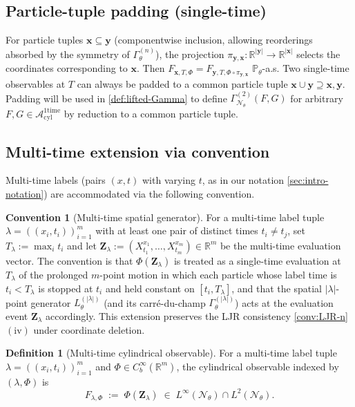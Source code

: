 \documentclass[11pt,reqno]{amsart}
\theoremstyle{plain}
\theoremstyle{definition}
\newtheorem{definition}[theorem]{Definition}
\newtheorem{convention}[theorem]{Convention}
\theoremstyle{remark}
\newcommand{\R}{\mathbb R}
\newcommand{\Prob}{\mathbb P}
\newcommand{\cA}{\mathcal A}
\newcommand{\cN}{\mathcal N}
\newcommand{\Aone}{\cA_{\mathrm{cyl}}^{\mathrm{1time}}}
\newcommand{\GamN}{\Gamma^{(2)}_{\cN_{\theta}}}
\newcommand{\GamM}[1]{\Gamma^{(#1)}_{\theta}}
\newcommand{\Lth}[1]{L^{(#1)}_{\theta}}
\newcommand{\Pth}{\Prob_{\theta}}
\begin{document}
\subsection{Particle-tuple padding (single-time)}\label{sec:cyl-padding-1t}

For particle tuples $\mathbf x\subseteq\mathbf y$ (componentwise
inclusion, allowing reorderings absorbed by the symmetry of
$\GamM{n}$), the projection
$\pi_{\mathbf y,\mathbf x}\colon\R^{|\mathbf y|}\to\R^{|\mathbf x|}$
selects the coordinates corresponding to $\mathbf x$. Then
$F_{\mathbf x,T,\Phi}=F_{\mathbf y,T,\Phi\circ\pi_{\mathbf y,\mathbf x}}$
$\Pth$-a.s. Two single-time observables at $T$ can always be padded
to a common particle tuple
$\mathbf x\cup\mathbf y\supseteq\mathbf x,\mathbf y$. Padding will
be used in \cref{def:lifted-Gamma} to define $\GamN(F,G)$ for
arbitrary $F,G\in\Aone$ by reduction to a common particle tuple.

\subsection{Multi-time extension via convention}\label{sec:cyl-multi-time}

Multi-time labels (pairs $(x,t)$ with varying $t$, as in our
notation \cref{sec:intro-notation}) are accommodated via the
following convention.

\begin{convention}[Multi-time spatial generator]\label{conv:multi-time}
For a multi-time label tuple
$\lambda=((x_{i},t_{i}))_{i=1}^{m}$ with at least one pair of
distinct times $t_{i}\neq t_{j}$, set
$T_{\lambda}:=\max_{i}t_{i}$ and let
$\mathbf Z_{\lambda}:=(X^{x_{1}}_{t_{1}},\ldots,X^{x_{m}}_{t_{m}})\in\R^{m}$
be the multi-time evaluation vector. The convention is that
$\Phi(\mathbf Z_{\lambda})$ is treated as a single-time evaluation
at $T_{\lambda}$ of the prolonged $m$-point motion in which each
particle whose label time is $t_{i}<T_{\lambda}$ is stopped at
$t_{i}$ and held constant on $[t_{i},T_{\lambda}]$, and that the
spatial $|\lambda|$-point generator $\Lth{|\lambda|}$ (and its
carr\'e-du-champ $\GamM{|\lambda|}$) acts at the evaluation event
$\mathbf Z_{\lambda}$ accordingly. This extension preserves the LJR
consistency \cref{conv:LJR-n}$(\mathrm{iv})$ under coordinate
deletion.
\end{convention}

\begin{definition}[Multi-time cylindrical observable]\label{def:cyl-observable}
For a multi-time label tuple
$\lambda=((x_{i},t_{i}))_{i=1}^{m}$ and
$\Phi\in C_{b}^{\infty}(\R^{m})$, the cylindrical observable
indexed by $(\lambda,\Phi)$ is
\begin{equation}\label{eq:F-lambda-Phi}
  F_{\lambda,\Phi}\;:=\;\Phi(\mathbf Z_{\lambda})
  \;\in\;L^{\infty}(\cN_{\theta})\cap L^{2}(\cN_{\theta}).
\end{equation}
\end{definition}
\end{document}
